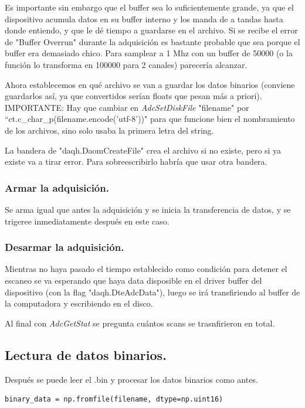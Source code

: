 Es importante sin embargo que el buffer sea lo suficientemente grande, ya que el dispositivo acumula datos en su buffer interno y los manda de a tandas hasta donde entiendo, y que le dé tiempo a guardarse en el archivo. Si se recibe el error de "Buffer Overrun" durante la adquisición es bastante probable que sea porque el buffer era demasiado chico. Para samplear a 1 Mhz con un buffer de 50000 (o la función lo transforma en 100000 para 2 canales) parecería alcanzar.

Ahora establecemos en qué archivo se van a guardar los datos binarios (conviene guardarlos así, ya que convertidos serían floats que pesan más a priori). IMPORTANTE: Hay que cambiar en \textit{AdcSetDiskFile} "filename" por  ``ct.c\_char\_p(filename.encode('utf-8'))" para que funcione bien el nombramiento de los archivos, sino solo usaba la primera letra del string. %

La bandera de "daqh.DaomCreateFile" crea el archivo si no existe, pero si ya existe va a tirar error. Para sobreescribirlo habría que usar otra bandera.


\subsubsection*{Armar la adquisición.}
Se arma igual que antes la adquisición y se inicia la transferencia de datos, y se trigeree inmediatamente después en este caso.

\subsubsection*{Desarmar la adquisición.}
Mientras no haya pasado el tiempo establecido como condición para detener el escaneo se va esperando que haya data disposible en el driver buffer del dispositivo (con la flag "daqh.DteAdcData"), luego se irá transfiriendo al buffer de la computadora y escribiendo en el disco. 

Al final con \textit{AdcGetStat} se pregunta cuántos scans se trasnfirieron en total.  

\subsection*{Lectura de datos binarios.}
Después se puede leer el .bin y procesar los datos binarios como antes.

\begin{lstlisting}
binary_data = np.fromfile(filename, dtype=np.uint16)
    
\end{lstlisting}

